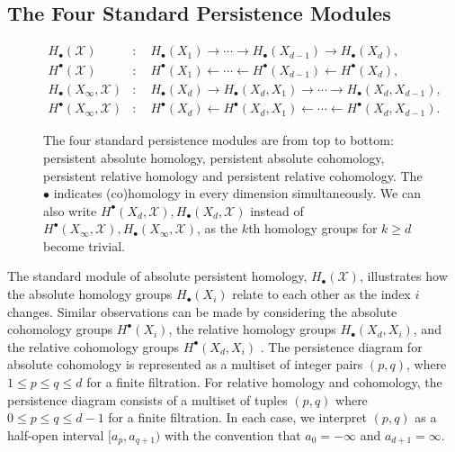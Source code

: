 \subsection{The Four Standard Persistence Modules}
\label{TheFourStandardPersistenceModules}
\begin{figure}[htb!]
	\begin{align*}
		H_{\bullet}(\mathcal{X})             & : \quad H_{\bullet}(X_{1}) \rightarrow \cdots \rightarrow H_{\bullet}(X_{d-1}) \rightarrow H_{\bullet}(X_{d}),             \\
		H^{\bullet}(\mathcal{X})             & : \quad H^{\bullet}(X_{1}) \leftarrow \cdots \leftarrow H^{\bullet}(X_{d-1}) \leftarrow H^{\bullet}(X_{d}),                \\
		H_{\bullet}(X_{\infty}, \mathcal{X}) & : \quad H_{\bullet}(X_{d}) \rightarrow H_{\bullet}(X_{d},X_{1}) \rightarrow \cdots \rightarrow H_{\bullet}(X_{d},X_{d-1}), \\
		H^{\bullet}(X_{\infty}, \mathcal{X}) & : \quad H^{\bullet}(X_{d}) \leftarrow H^{\bullet}(X_{d},X_{1}) \leftarrow \cdots \leftarrow H^{\bullet}(X_{d}, X_{d-1}).
	\end{align*}
	\caption{The four standard persistence modules are from top to bottom: persistent absolute homology, persistent absolute cohomology, persistent relative homology and persistent relative cohomology. The $\bullet$ indicates (co)homology in every dimension simultaneously. We can also write $H^{\bullet}(X_{d}, \mathcal{X}), H_{\bullet}(X_{d}, \mathcal{X})$ instead of $H^{\bullet}(X_{\infty}, \mathcal{X}), H_{\bullet}(X_{\infty}, \mathcal{X})$, as the $k$th homology groups for $k \geq d$ become trivial.}
\end{figure}
The standard module of absolute persistent homology, $H_{\bullet}(\mathcal{X})$, illustrates how the absolute homology groups
$H_{\bullet}(X_{i})$ relate to each other as the index $i$ changes. Similar observations
can be made by considering the absolute cohomology groups $H^{\bullet}(X_{i})$,
the relative homology groups $H_{\bullet}(X_{d}, X_{i})$, and the relative cohomology
groups $H^{\bullet}(X_{d}, X_{i})$ \cite[\S 2.4]{de2011dualities}. The persistence diagram for absolute cohomology is represented as a multiset of integer
pairs $(p,q)$, where $1 \leq p \leq q \leq d$ for a finite filtration. For relative
homology and cohomology, the persistence diagram consists of a multiset of
tuples $(p,q)$ where $0 \leq p \leq q \leq d-1$ for a finite filtration. In each
case, we interpret $(p,q)$ as a half-open interval $[a_{p}, a_{q+1})$ with the
convention that $a_{0} = -\infty$ and $a_{d+1} = \infty$.


